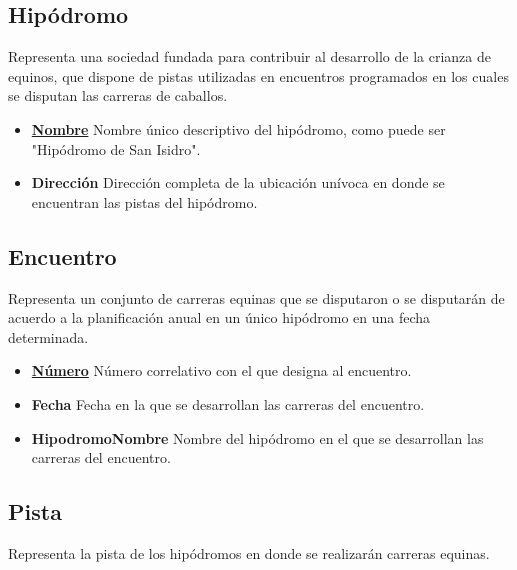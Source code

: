 \documentclass[a4paper,11pt]{article}
\begin{document}
\subsection{Hipódromo}

Representa una sociedad fundada para contribuir al desarrollo de la crianza de
equinos, que dispone de pistas utilizadas en encuentros programados en los
cuales se disputan las carreras de caballos.

\begin{itemize}

  \item \textbf{\uline{Nombre}} Nombre único descriptivo del hipódromo, como
    puede ser "Hipódromo de San Isidro".

  \item \textbf{Dirección} Dirección completa de la ubicación unívoca en donde
    se encuentran las pistas del hipódromo.

\end{itemize}

\subsection{Encuentro}

Representa un conjunto de carreras equinas que se disputaron o se disputarán de
acuerdo a la planificación anual en un único hipódromo en una fecha
determinada.

\begin{itemize}

  \item \textbf{\uline{Número}} Número correlativo con el que designa al
    encuentro.

  \item \textbf{Fecha} Fecha en la que se desarrollan las carreras del
    encuentro.

  \item \textbf{HipodromoNombre} Nombre del hipódromo en el que se
    desarrollan las carreras del encuentro.

\end{itemize}

\subsection{Pista}

Representa la pista de los hipódromos en donde se realizarán carreras equinas.
\end{document}
